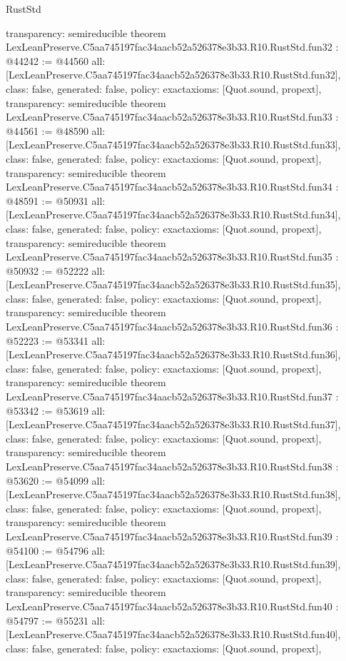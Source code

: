 \begin{lexlean}{RustStd}
\begin{coremodule}
{  transparency: semireducible
}
theorem LexLeanPreserve.C5aa745197fac34aacb52a526378e3b33.R10.RustStd.fun32 : @44242 := @44560 {
  all: [LexLeanPreserve.C5aa745197fac34aacb52a526378e3b33.R10.RustStd.fun32],
  class: false,
  generated: false,
  policy: exact{axioms: [Quot.sound, propext]},
  transparency: semireducible
}
theorem LexLeanPreserve.C5aa745197fac34aacb52a526378e3b33.R10.RustStd.fun33 : @44561 := @48590 {
  all: [LexLeanPreserve.C5aa745197fac34aacb52a526378e3b33.R10.RustStd.fun33],
  class: false,
  generated: false,
  policy: exact{axioms: [Quot.sound, propext]},
  transparency: semireducible
}
theorem LexLeanPreserve.C5aa745197fac34aacb52a526378e3b33.R10.RustStd.fun34 : @48591 := @50931 {
  all: [LexLeanPreserve.C5aa745197fac34aacb52a526378e3b33.R10.RustStd.fun34],
  class: false,
  generated: false,
  policy: exact{axioms: [Quot.sound, propext]},
  transparency: semireducible
}
theorem LexLeanPreserve.C5aa745197fac34aacb52a526378e3b33.R10.RustStd.fun35 : @50932 := @52222 {
  all: [LexLeanPreserve.C5aa745197fac34aacb52a526378e3b33.R10.RustStd.fun35],
  class: false,
  generated: false,
  policy: exact{axioms: [Quot.sound, propext]},
  transparency: semireducible
}
theorem LexLeanPreserve.C5aa745197fac34aacb52a526378e3b33.R10.RustStd.fun36 : @52223 := @53341 {
  all: [LexLeanPreserve.C5aa745197fac34aacb52a526378e3b33.R10.RustStd.fun36],
  class: false,
  generated: false,
  policy: exact{axioms: [Quot.sound, propext]},
  transparency: semireducible
}
theorem LexLeanPreserve.C5aa745197fac34aacb52a526378e3b33.R10.RustStd.fun37 : @53342 := @53619 {
  all: [LexLeanPreserve.C5aa745197fac34aacb52a526378e3b33.R10.RustStd.fun37],
  class: false,
  generated: false,
  policy: exact{axioms: [Quot.sound, propext]},
  transparency: semireducible
}
theorem LexLeanPreserve.C5aa745197fac34aacb52a526378e3b33.R10.RustStd.fun38 : @53620 := @54099 {
  all: [LexLeanPreserve.C5aa745197fac34aacb52a526378e3b33.R10.RustStd.fun38],
  class: false,
  generated: false,
  policy: exact{axioms: [Quot.sound, propext]},
  transparency: semireducible
}
theorem LexLeanPreserve.C5aa745197fac34aacb52a526378e3b33.R10.RustStd.fun39 : @54100 := @54796 {
  all: [LexLeanPreserve.C5aa745197fac34aacb52a526378e3b33.R10.RustStd.fun39],
  class: false,
  generated: false,
  policy: exact{axioms: [Quot.sound, propext]},
  transparency: semireducible
}
theorem LexLeanPreserve.C5aa745197fac34aacb52a526378e3b33.R10.RustStd.fun40 : @54797 := @55231 {
  all: [LexLeanPreserve.C5aa745197fac34aacb52a526378e3b33.R10.RustStd.fun40],
  class: false,
  generated: false,
  policy: exact{axioms: [Quot.sound, propext]},
}
\end{coremodule}
\end{lexlean}
